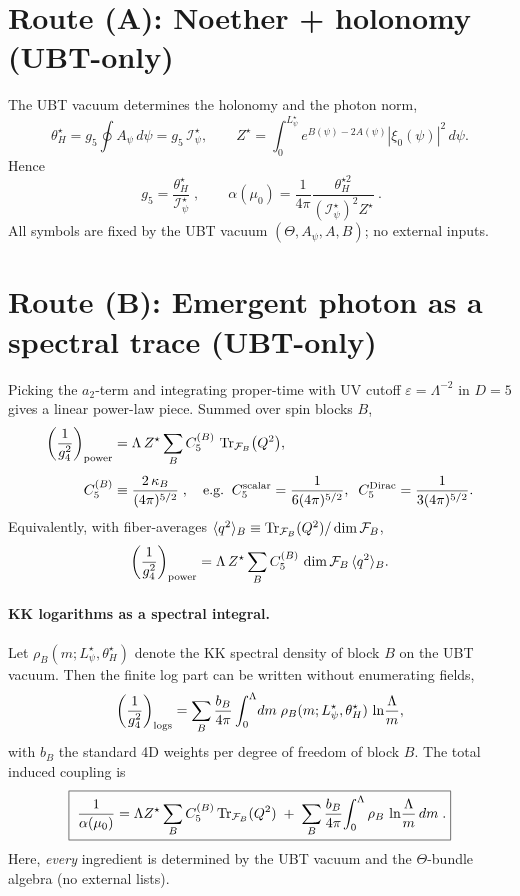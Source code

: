 \documentclass[12pt]{article}
\begin{document}
\section{Route (A): Noether + holonomy (UBT-only)}
The UBT vacuum determines the holonomy and the photon norm,
\begin{equation}
\theta_H^\star = g_5 \oint A_\psi\, d\psi = g_5\,\mathcal I_\psi^\star,
\qquad
Z^\star=\int_0^{L_\psi^\star} e^{B(\psi)-2A(\psi)} |\xi_0(\psi)|^2\, d\psi.
\end{equation}
Hence
\begin{equation}
\boxed{~ g_5=\frac{\theta_H^\star}{\mathcal I_\psi^\star} \;,\qquad
\alpha(\mu_0)=\frac{1}{4\pi}\frac{\theta_H^{\star 2}}{(\mathcal I_\psi^\star)^2 Z^\star} ~}.
\end{equation}
All symbols are fixed by the UBT vacuum $(\Theta, A_\psi, A,B)$; no external inputs.

\section{Route (B): Emergent photon as a spectral trace (UBT-only)}
Picking the $a_2$-term and integrating proper-time with UV cutoff $\varepsilon=\Lambda^{-2}$ in $D=5$ gives a linear power-law piece.
Summed over spin blocks $B$,
\begin{align}
\left(\frac{1}{g_4^2}\right)_{\rm power}
&= \Lambda\, Z^\star \sum_B C_5^{(B)} \,\Tr_{\mathcal F_B}\!\big(Q^2\big),
\\[4pt]
C_5^{(B)} &\equiv \frac{2\,\kappa_B}{(4\pi)^{5/2}} \;,
\quad
\text{e.g.}\;\; C_5^{\rm scalar}=\frac{1}{6(4\pi)^{5/2}},\;\;
C_5^{\rm Dirac}=\frac{1}{3(4\pi)^{5/2}}.
\end{align}
Equivalently, with fiber-averages $\langle q^2\rangle_B \equiv \Tr_{\mathcal F_B}(Q^2)/\dim\mathcal F_B$,
\begin{equation}
\left(\frac{1}{g_4^2}\right)_{\rm power}
= \Lambda\, Z^\star \sum_B C_5^{(B)} \,\dim\mathcal F_B \,\langle q^2\rangle_B.
\end{equation}

\paragraph{KK logarithms as a spectral integral.}
Let $\rho_B(m; L_\psi^\star,\theta_H^\star)$ denote the KK spectral density of block $B$ on the UBT vacuum.
Then the finite log part can be written without enumerating fields,
\begin{equation}
\left(\frac{1}{g_4^2}\right)_{\rm logs}
= \sum_B \frac{b_B}{4\pi}\int_0^\Lambda \! dm \;\rho_B(m;L_\psi^\star,\theta_H^\star)\, \ln\!\frac{\Lambda}{m},
\end{equation}
with $b_B$ the standard 4D weights per degree of freedom of block $B$. The total induced coupling is
\begin{equation}
\boxed{\;\frac{1}{\alpha(\mu_0)}=\Lambda Z^\star \sum_B C_5^{(B)} \Tr_{\mathcal F_B}(Q^2)
\;+\; \sum_B \frac{b_B}{4\pi}\!\int_0^\Lambda \rho_B\,\ln\!\frac{\Lambda}{m}\, dm\; .}
\end{equation}
Here, \emph{every} ingredient is determined by the UBT vacuum and the $\Theta$-bundle algebra (no external lists).
\end{document}
